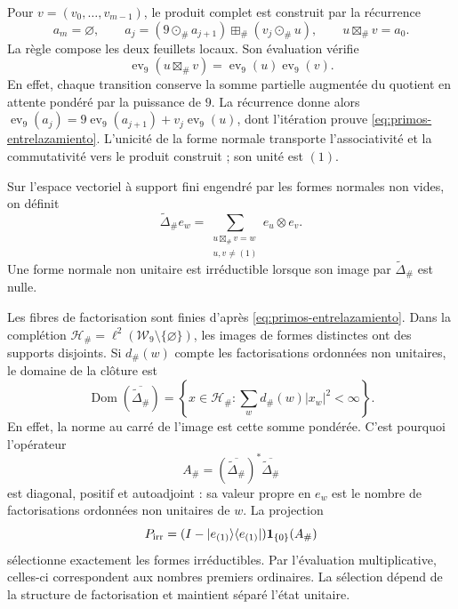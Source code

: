 Pour \(v=(v_0,\ldots,v_{m-1})\), le produit complet est construit par
la récurrence
\[
 a_m=\varnothing,\qquad
 a_j=(9\odot_\#a_{j+1})\boxplus_\#(v_j\odot_\#u),
 \qquad u\boxtimes_\#v=a_0.
\]
La règle compose les deux feuillets locaux. Son évaluation vérifie
\begin{equation}
 \operatorname{ev}_9(u\boxtimes_\#v)
   =\operatorname{ev}_9(u)\operatorname{ev}_9(v).
 \label{eq:primos-entrelazamiento}
\end{equation}
En effet, chaque transition conserve la somme partielle augmentée du quotient
en attente pondéré par la puissance de \(9\). La récurrence donne alors
\(\operatorname{ev}_9(a_j)=9\operatorname{ev}_9(a_{j+1})+
v_j\operatorname{ev}_9(u)\), dont l'itération prouve
\eqref{eq:primos-entrelazamiento}. L'unicité de la forme normale transporte
l'associativité et la commutativité vers le produit construit ; son unité est \((1)\).

\begin{definition}
Sur l'espace vectoriel à support fini engendré par les formes normales non vides, on définit
\[
 \widetilde\Delta_\# e_w
 =\sum_{\substack{u\boxtimes_\#v=w\\u,v\ne(1)}}e_u\otimes e_v.
\]
Une forme normale non unitaire est irréductible lorsque son image par
\(\widetilde\Delta_\#\) est nulle.
\end{definition}

Les fibres de factorisation sont finies d'après
\eqref{eq:primos-entrelazamiento}. Dans la complétion
\(\mathcal H_\#=\ell^2(\mathcal W_9\setminus\{\varnothing\})\),
les images de formes distinctes ont des supports disjoints. Si
\(d_\#(w)\) compte les factorisations ordonnées non unitaires, le domaine
de la clôture est
\[
 \operatorname{Dom}(\overline{\widetilde\Delta_\#})
 =\left\{x\in\mathcal H_\#:
       \sum_w d_\#(w)|x_w|^2<\infty\right\}.
\]
En effet, la norme au carré de l’image est cette somme pondérée. C’est pourquoi
l’opérateur
\[
 A_\#=(\overline{\widetilde\Delta_\#})^*
                  \overline{\widetilde\Delta_\#}
\]
est diagonal, positif et autoadjoint : sa valeur propre en \(e_w\) est le
nombre de factorisations ordonnées non unitaires de \(w\). La projection
\[
 P_{\rm irr}=(I-|e_{(1)}\rangle\langle e_{(1)}|)
                    \mathbf1_{\{0\}}(A_\#)
\]
sélectionne exactement les formes irréductibles. Par l'évaluation multiplicative, celles-ci correspondent aux nombres premiers ordinaires. La sélection dépend de la structure de factorisation et maintient séparé l'état unitaire.

